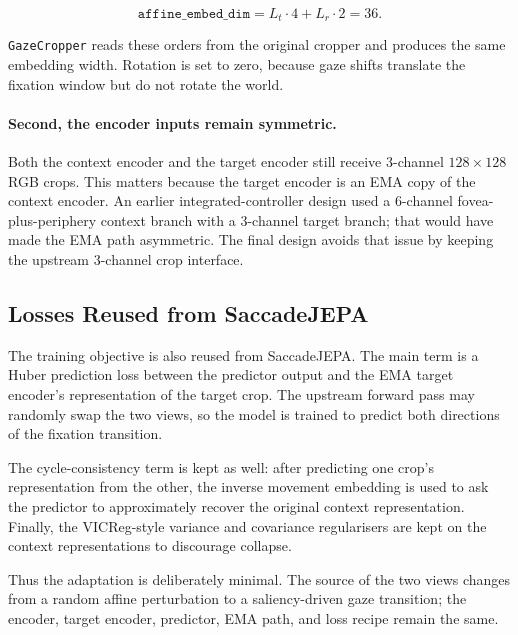 \documentclass[12pt,a4paper]{article}
\begin{document}
\begin{equation}
  \texttt{affine\_embed\_dim} = L_t \cdot 4 + L_r \cdot 2 = 36.
  \label{eq:nerf-encoding}
\end{equation}

\texttt{GazeCropper} reads these orders from the original cropper and produces
the same embedding width. Rotation is set to zero, because gaze shifts translate
the fixation window but do not rotate the world.

\paragraph{Second, the encoder inputs remain symmetric.}
Both the context encoder and the target encoder still receive $3$-channel
$128 \times 128$ RGB crops. This matters because the target encoder is an EMA
copy of the context encoder. An earlier integrated-controller design used a
$6$-channel fovea-plus-periphery context branch with a $3$-channel target
branch; that would have made the EMA path asymmetric. The final design avoids
that issue by keeping the upstream $3$-channel crop interface.

\subsection{Losses Reused from SaccadeJEPA}
\label{subsec:saccade-losses}

The training objective is also reused from SaccadeJEPA. The main term is a
Huber prediction loss between the predictor output and the EMA target encoder's
representation of the target crop. The upstream forward pass may randomly swap
the two views, so the model is trained to predict both directions of the
fixation transition.

The cycle-consistency term is kept as well: after predicting one crop's
representation from the other, the inverse movement embedding is used to ask the
predictor to approximately recover the original context representation.
Finally, the VICReg-style variance and covariance regularisers are kept on the
context representations to discourage collapse.

Thus the adaptation is deliberately minimal. The source of the two views changes
from a random affine perturbation to a saliency-driven gaze transition; the
encoder, target encoder, predictor, EMA path, and loss recipe remain the same.

\end{document}
